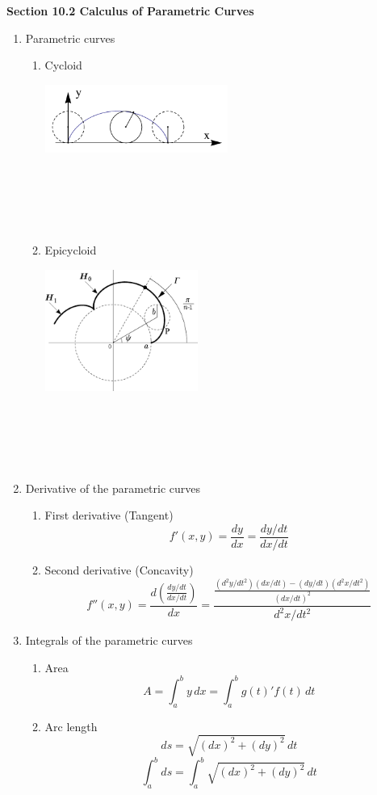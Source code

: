 \documentclass[12px]{article}
\begin{document}
\begin{center}
    \Large\textbf{Section 10.2 Calculus of Parametric Curves}
\end{center}
\begin{enumerate}
    \item Parametric curves
    \begin{enumerate}[(1)]
        \item Cycloid
        \begin{center}
            \includegraphics*[width=6cm]{cycloid.png}\\
        \end{center}\leavevmode\newline
        \\
        \\
        \\
        \\
        \item Epicycloid
        \begin{center}
            \includegraphics*[width=5cm]{epicycloid.png}\\
        \end{center}\leavevmode\newline
        \\
        \\
        \\
        \\
    \end{enumerate}
    \item Derivative of the parametric curves
    \begin{enumerate}[(1)]
        \item First derivative (Tangent)
        $$f'(x,y)=\frac{dy}{dx}=\frac{dy/dt}{dx/dt}$$
        \item Second derivative (Concavity)
        $$f''(x,y)=\frac{d(\frac{dy/dt}{dx/dt})}{dx}=\frac{\frac{(d^2y/dt^2)(dx/dt)-(dy/dt)(d^2x/dt^2)}{(dx/dt)^2}}{d^2x/dt^2}$$
    \end{enumerate}
\newpage
    \item Integrals of the parametric curves
    \begin{enumerate}[(1)]
        \item Area
        $$A=\int_a^by\,dx=\int_a^bg(t)'f(t)\,dt$$
        \item Arc length
        $$ds=\sqrt{(dx)^2+(dy)^2}\,dt$$
        $$\int_a^bds=\int_a^b\sqrt{(dx)^2+(dy)^2}\,dt$$
    \end{enumerate}
\end{enumerate}\leavevmode\newline
\end{document}

